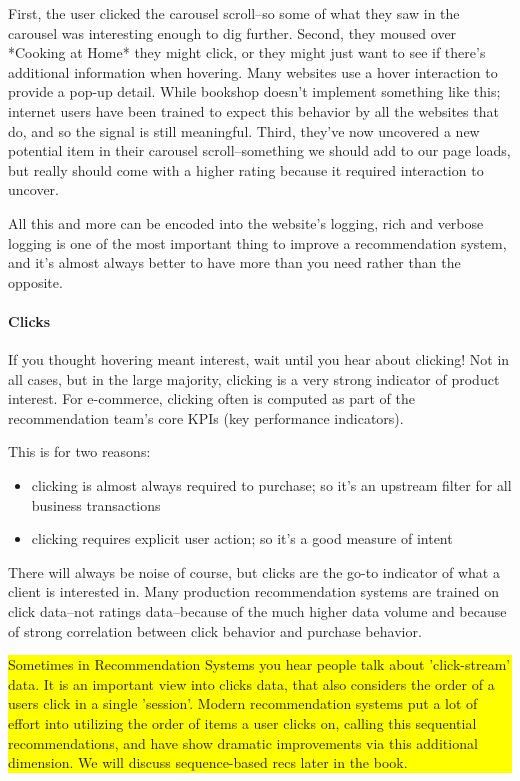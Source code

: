 First, the user clicked the carousel scroll–so some of what they saw in the carousel was interesting enough to dig further. Second, they moused over *Cooking at Home* they might click, or they might just want to see if there's additional information when hovering. Many websites use a hover interaction to provide a pop-up detail. While bookshop doesn't implement something like this; internet users have been trained to expect this behavior by all the websites that do, and so the signal is still meaningful. Third, they've now uncovered a new potential item in their carousel scroll–something we should add to our page loads, but really should come with a higher rating because it required interaction to uncover. 

All this and more can be encoded into the website's logging, rich and verbose logging is one of the most important thing to improve a recommendation system, and it's almost always better to have more than you need rather than the opposite.

\paragraph{Clicks}

If you thought hovering meant interest, wait until you hear about clicking! Not in all cases, but in the large majority, clicking is a very strong indicator of product interest. For e-commerce, clicking often is computed as part of the recommendation team's core KPIs (key performance indicators). 

This is for two reasons:

\begin{itemize}
\item clicking is almost always required to purchase; so it's an upstream filter for all business transactions
\item clicking requires explicit user action; so it's a good measure of intent
\end{itemize}

There will always be noise of course, but clicks are the go-to indicator of what a client is interested in. Many production recommendation systems are trained on click data–not ratings data–because of the much higher data volume and because of strong correlation between click behavior and purchase behavior. 


\vspace{10pt}
\colorbox{yellow}{\parbox{\textwidth}{ Sometimes in Recommendation Systems you hear people talk about 'click-stream' data. It is an important view into clicks data, that also considers the order of a users click in a single 'session'. Modern recommendation systems put a lot of effort into utilizing the order of items a user clicks on, calling this sequential recommendations, and have show dramatic improvements via this additional dimension. We will discuss sequence-based recs later in the book.
}}
\vspace{10pt}

